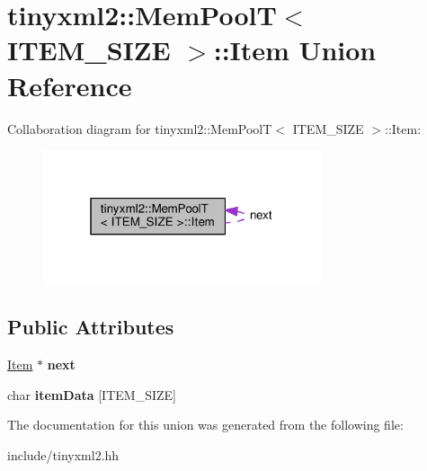\hypertarget{uniontinyxml2_1_1MemPoolT_1_1Item}{}\section{tinyxml2\+:\+:Mem\+PoolT$<$ I\+T\+E\+M\+\_\+\+S\+I\+ZE $>$\+:\+:Item Union Reference}
\label{uniontinyxml2_1_1MemPoolT_1_1Item}


Collaboration diagram for tinyxml2\+:\+:Mem\+PoolT$<$ I\+T\+E\+M\+\_\+\+S\+I\+ZE $>$\+:\+:Item\+:
\nopagebreak
\begin{figure}[H]
\begin{center}
\leavevmode
\includegraphics[width=232pt]{uniontinyxml2_1_1MemPoolT_1_1Item__coll__graph}
\end{center}
\end{figure}
\subsection*{Public Attributes}
\begin{DoxyCompactItemize}
\item 
\hyperlink{uniontinyxml2_1_1MemPoolT_1_1Item}{Item} $\ast$ {\bfseries next}\hypertarget{uniontinyxml2_1_1MemPoolT_1_1Item_a5620107f518c60d6619e8662d4c9d643}{}\label{uniontinyxml2_1_1MemPoolT_1_1Item_a5620107f518c60d6619e8662d4c9d643}

\item 
char {\bfseries item\+Data} \mbox{[}I\+T\+E\+M\+\_\+\+S\+I\+ZE\mbox{]}\hypertarget{uniontinyxml2_1_1MemPoolT_1_1Item_aff63ccc8d7b05035820b83e1f0fa8037}{}\label{uniontinyxml2_1_1MemPoolT_1_1Item_aff63ccc8d7b05035820b83e1f0fa8037}

\end{DoxyCompactItemize}


The documentation for this union was generated from the following file\+:\begin{DoxyCompactItemize}
\item 
include/tinyxml2.\+hh\end{DoxyCompactItemize}
